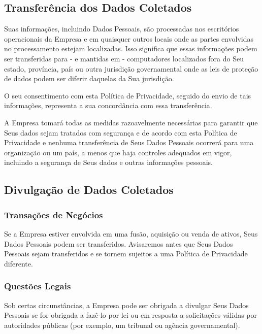 \subsection{Transferência dos Dados Coletados}

Suas informações, incluindo Dados Pessoais, são processadas nos escritórios operacionais da Empresa e em quaisquer outros locais onde as partes envolvidas no processamento estejam localizadas. Isso significa que essas informações podem ser transferidas para - e mantidas em - computadores localizados fora do Seu estado, província, país ou outra jurisdição governamental onde as leis de proteção de dados podem ser diferir daquelas da Sua jurisdição.

O seu consentimento com esta Política de Privacidade, seguido do envio de tais informações, representa a sua concordância com essa transferência.

A Empresa tomará todas as medidas razoavelmente necessárias para garantir que Seus dados sejam tratados com segurança e de acordo com esta Política de Privacidade e nenhuma transferência de Seus Dados Pessoais ocorrerá para uma organização ou um país, a menos que haja controles adequados em vigor, incluindo a segurança de Seus dados e outras informações pessoais.

\subsection{Divulgação de Dados Coletados}

\subsubsection{Transações de Negócios}

Se a Empresa estiver envolvida em uma fusão, aquisição ou venda de ativos, Seus Dados Pessoais podem ser transferidos. Avisaremos antes que Seus Dados Pessoais sejam transferidos e se tornem sujeitos a uma Política de Privacidade diferente.

\subsubsection{Questões Legais}

Sob certas circunstâncias, a Empresa pode ser obrigada a divulgar Seus Dados Pessoais se for obrigada a fazê-lo por lei ou em resposta a solicitações válidas por autoridades públicas (por exemplo, um tribunal ou agência governamental).

